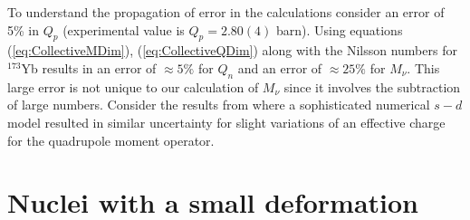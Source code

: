 \documentclass[10pt,a4paper, twoside]{report}
\begin{document}
To understand the propagation of error in the calculations consider an error of 5\% in $Q_p$ (experimental value is $Q_p = 2.80(4)$ barn). Using equations  (\ref{eq:CollectiveMDim}), (\ref{eq:CollectiveQDim}) along with the Nilsson numbers for $^{173}$Yb results in an error of $\approx 5\%$ for  $Q_n$  and an error of $\approx 25\%$ for $M_{\nu}$. This large error is not unique to our calculation of $M_{\nu}$ since it involves the subtraction of large numbers. Consider the results from \cite{Brown2016} where a sophisticated numerical $s-d$ model resulted in similar uncertainty for slight variations of an effective charge for the quadrupole moment operator.

\section{Nuclei with a small deformation} \label{sec:Minimal}
\end{document}
